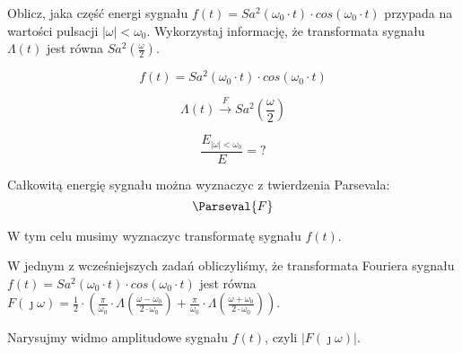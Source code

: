\begin{task}

Oblicz, jaka część energi sygnału $f(t)=Sa^2\left(\omega_0 \cdot t\right) \cdot cos\left(\omega_0 \cdot t\right)$ przypada na wartości pulsacji 
$\left| \omega \right| < \omega_0$. Wykorzystaj informację, że transformata sygnału $\Lambda(t)$ jest równa $Sa^2\left(\frac{\omega}{2}\right)$.

\begin{equation}
f(t) = Sa^2\left(\omega_0 \cdot t\right) \cdot cos\left(\omega_0 \cdot t\right)
\end{equation}

\begin{equation}
\Lambda(t) \overset{F}{\rightarrow} Sa^2\left(\frac{\omega}{2}\right)
\end{equation}

\begin{equation}
\frac{E_{\left| \omega \right| < \omega_0}}{E} = ?
\end{equation}

Całkowitą energię sygnału można wyznaczyc z twierdzenia Parsevala:
\begin{equation}
\Parseval{F}
\end{equation}

W tym celu musimy wyznaczyc transformatę sygnału $f(t)$.

W jednym z wcześniejszych zadań obliczyliśmy, że transformata Fouriera sygnału $f(t)=Sa^2\left(\omega_0 \cdot t\right) \cdot cos\left(\omega_0 \cdot t\right)$ jest równa $F(\jmath \omega)=\frac{1}{2 } \cdot \left( \frac{\pi}{ \omega_0 } \cdot \Lambda\left( \frac{\omega - \omega_0}{2\cdot \omega_0}\right) + \frac{\pi}{ \omega_0 } \cdot \Lambda\left( \frac{\omega + \omega_0}{2\cdot \omega_0}\right) \right)$.

Narysujmy widmo amplitudowe sygnału $f(t)$, czyli $\left|F(\jmath \omega)\right|$.

\begin{figure}[H]
	\centering
\end{figure}
\end{task}
